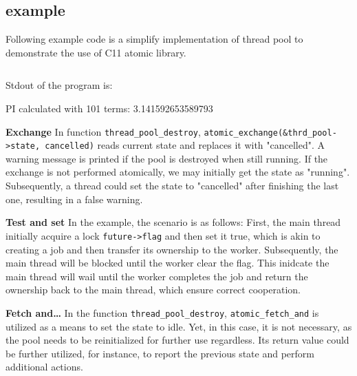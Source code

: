 \documentclass[fontsize=10pt, oneside]{scrartcl}
\newcommand{\monobox}[1]{\mbox{\texttt{#1}}}
\newcommand{\clang}[1]{C}
\begin{document}
\subsection{example}
\label{rmw_example}
Following example code is a simplify implementation of thread pool to demonstrate the use of \clang{}11 atomic library.

\inputminted{c}{./examples/rmw_example.c}

Stdout of the program is:
\begin{ccode}
PI calculated with 101 terms: 3.141592653589793
\end{ccode}

\textbf{Exchange}
In function \monobox{thread\_pool\_destroy}, \monobox{atomic\_exchange(\&thrd\_pool->state, cancelled)} reads current state and replaces it with "cancelled". A warning message is printed if the pool is destroyed when still running. 
If the exchange is not performed atomically, we may initially get the state as "running". Subsequently, a thread could set the state to "cancelled" after finishing the last one, resulting in a false warning.

\textbf{Test and set}
In the example, the scenario is as follows: 
First, the main thread initially acquire a lock \monobox{future->flag} and then set it true, 
which is akin to creating a job and then transfer its ownership to the worker. 
Subsequently, the main thread will be blocked until the worker clear the flag. 
This inidcate the main thread will wail until the worker completes the job and return the ownership back to the main thread, which ensure correct cooperation.

\textbf{Fetch and…}
In the function \monobox{thread\_pool\_destroy}, \monobox{atomic\_fetch\_and} is utilized as a means to set the state to idle. 
Yet, in this case, it is not necessary, as the pool needs to be reinitialized for further use regardless.
Its return value could be further utilized, for instance, to report the previous state and perform additional actions.
\end{document}
